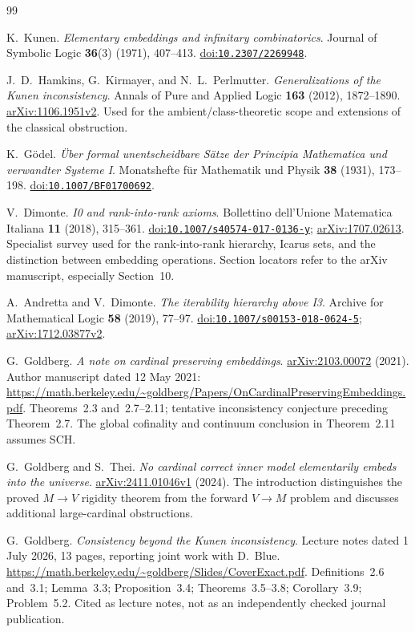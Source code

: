 \documentclass[11pt,letterpaper]{article}
\theoremstyle{definition}
\newcommand{\arxiv}[1]{\href{https://arxiv.org/abs/#1}{arXiv:#1}}
\newcommand{\doi}[1]{\href{https://doi.org/#1}{doi:\nolinkurl{#1}}}
\begin{document}
\clearpage
{}
{}
\begin{thebibliography}{99}
\small
\setlength{\itemsep}{6pt}
\setlength{\parskip}{1pt}

K.~Kunen. \emph{Elementary embeddings and infinitary combinatorics}.
Journal of Symbolic Logic \textbf{36}(3) (1971), 407--413.
\doi{10.2307/2269948}.

J.~D.~Hamkins, G.~Kirmayer, and N.~L.~Perlmutter.
\emph{Generalizations of the Kunen inconsistency}.
Annals of Pure and Applied Logic \textbf{163} (2012), 1872--1890.
\arxiv{1106.1951v2}. Used for the ambient/class-theoretic scope and extensions of the classical obstruction.

K.~G\"odel. \emph{\"Uber formal unentscheidbare S\"atze der Principia Mathematica und verwandter Systeme I}.
Monatshefte f\"ur Mathematik und Physik \textbf{38} (1931), 173--198.
\doi{10.1007/BF01700692}.

V.~Dimonte. \emph{I0 and rank-into-rank axioms}.
Bollettino dell'Unione Matematica Italiana \textbf{11} (2018), 315--361.
\doi{10.1007/s40574-017-0136-y}; \arxiv{1707.02613}.
Specialist survey used for the rank-into-rank hierarchy, Icarus sets, and the distinction between embedding operations. Section locators refer to the arXiv manuscript, especially Section~10.

A.~Andretta and V.~Dimonte. \emph{The iterability hierarchy above I3}.
Archive for Mathematical Logic \textbf{58} (2019), 77--97.
\doi{10.1007/s00153-018-0624-5}; \arxiv{1712.03877v2}.

G.~Goldberg. \emph{A note on cardinal preserving embeddings}.
\arxiv{2103.00072} (2021). Author manuscript dated 12 May 2021:
\url{https://math.berkeley.edu/~goldberg/Papers/OnCardinalPreservingEmbeddings.pdf}.
Theorems~2.3 and~2.7--2.11; tentative inconsistency conjecture preceding Theorem~2.7. The global cofinality and continuum conclusion in Theorem~2.11 assumes SCH.

G.~Goldberg and S.~Thei.
\emph{No cardinal correct inner model elementarily embeds into the universe}.
\arxiv{2411.01046v1} (2024).
The introduction distinguishes the proved $M\to V$ rigidity theorem from the forward $V\to M$ problem and discusses additional large-cardinal obstructions.

G.~Goldberg. \emph{Consistency beyond the Kunen inconsistency}.
Lecture notes dated 1 July 2026, 13 pages, reporting joint work with D.~Blue.
\url{https://math.berkeley.edu/~goldberg/Slides/CoverExact.pdf}.
Definitions~2.6 and~3.1; Lemma~3.3; Proposition~3.4; Theorems~3.5--3.8; Corollary~3.9; Problem~5.2. Cited as lecture notes, not as an independently checked journal publication.


\end{thebibliography}
\end{document}
